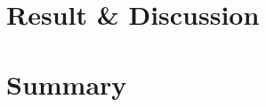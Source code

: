 \pagebreak
\part{Result \& Discussion}
\pagebreak


\pagebreak
\part{Summary}
\pagebreak


\pagebreak
\printbibliography

%













